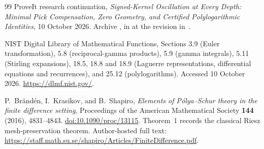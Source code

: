 \begin{thebibliography}{99}
ProveIt research continuation,
\emph{Signed-Kernel Oscillation at Every Depth: Minimal Pick
Compensation, Zero Geometry, and Certified Polylogarithmic Identities},
10 October 2026.
Archive ,
in  at the revision in~\cite{ProveIt}.

NIST Digital Library of Mathematical Functions,
Sections 3.9 (Euler transformation), 5.8 (reciprocal-gamma products),
5.9 (gamma integrals), 5.11 (Stirling expansions),
18.5, 18.8 and 18.9 (Laguerre representations, differential equations
and recurrences), and 25.12 (polylogarithms).
Accessed 10 October 2026.
\url{https://dlmf.nist.gov/}.

P.~Br\"and\'en, I.~Krasikov, and B.~Shapiro,
\emph{Elements of P\'olya--Schur theory in the finite difference setting},
Proceedings of the American Mathematical Society
\textbf{144} (2016), 4831--4843.
\href{https://doi.org/10.1090/proc/13115}{doi:10.1090/proc/13115}.
Theorem~1 records the classical Riesz mesh-preservation theorem.
Author-hosted full text:
\url{https://staff.math.su.se/shapiro/Articles/FiniteDifference.pdf}.

\end{thebibliography}
